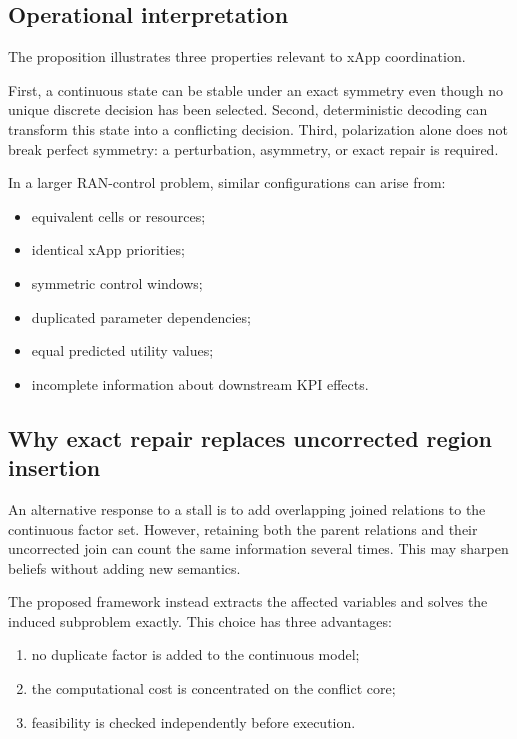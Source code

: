 \documentclass[pdflatex,sn-mathphys-num,iicol,oneside]{sn-jnl}
\begin{document}
\subsection{Operational interpretation}

The proposition illustrates three properties relevant to xApp
coordination.

First, a continuous state can be stable under an exact symmetry even
though no unique discrete decision has been selected. Second,
deterministic decoding can transform this state into a conflicting
decision. Third, polarization alone does not break perfect symmetry:
a perturbation, asymmetry, or exact repair is required.

In a larger RAN-control problem, similar configurations can arise
from:

\begin{itemize}
    \item equivalent cells or resources;
    \item identical xApp priorities;
    \item symmetric control windows;
    \item duplicated parameter dependencies;
    \item equal predicted utility values;
    \item incomplete information about downstream KPI effects.
\end{itemize}

\subsection{Why exact repair replaces uncorrected region insertion}

An alternative response to a stall is to add overlapping joined
relations to the continuous factor set. However, retaining both the
parent relations and their uncorrected join can count the same
information several times. This may sharpen beliefs without adding
new semantics.

The proposed framework instead extracts the affected variables and
solves the induced subproblem exactly. This choice has three
advantages:

\begin{enumerate}
    \item no duplicate factor is added to the continuous model;
    \item the computational cost is concentrated on the conflict core;
    \item feasibility is checked independently before execution.
\end{enumerate}
\end{document}
